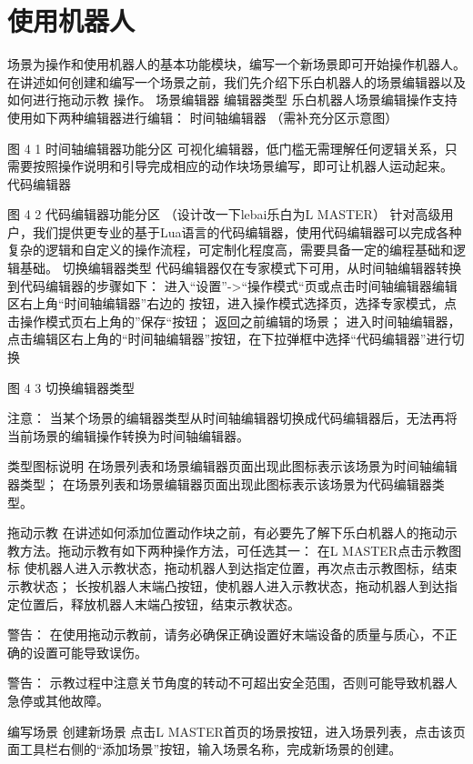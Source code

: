 \chapter{使用机器人}

场景为操作和使用机器人的基本功能模块，编写一个新场景即可开始操作机器人。在讲述如何创建和编写一个场景之前，我们先介绍下乐白机器人的场景编辑器以及如何进行拖动示教 操作。
场景编辑器
编辑器类型
乐白机器人场景编辑操作支持使用如下两种编辑器进行编辑：
时间轴编辑器 
（需补充分区示意图）






图 4 1 时间轴编辑器功能分区
 可视化编辑器，低门槛无需理解任何逻辑关系，只需要按照操作说明和引导完成相应的动作块场景编写，即可让机器人运动起来。
代码编辑器

 
图 4 2  代码编辑器功能分区
（设计改一下lebai乐白为L MASTER）
针对高级用户，我们提供更专业的基于Lua语言的代码编辑器，使用代码编辑器可以完成各种复杂的逻辑和自定义的操作流程，可定制化程度高，需要具备一定的编程基础和逻辑基础。
切换编辑器类型
代码编辑器仅在专家模式下可用，从时间轴编辑器转换到代码编辑器的步骤如下：
	进入“设置”->“操作模式“页或点击时间轴编辑器编辑区右上角“时间轴编辑器”右边的 按钮，进入操作模式选择页，选择专家模式，点击操作模式页右上角的”保存“按钮；
	返回之前编辑的场景；
	进入时间轴编辑器，点击编辑区右上角的“时间轴编辑器”按钮，在下拉弹框中选择“代码编辑器”进行切换
 
图 4 3 切换编辑器类型

 	注意：
当某个场景的编辑器类型从时间轴编辑器切换成代码编辑器后，无法再将当前场景的编辑操作转换为时间轴编辑器。

类型图标说明
 在场景列表和场景编辑器页面出现此图标表示该场景为时间轴编辑器类型；
 在场景列表和场景编辑器页面出现此图标表示该场景为代码编辑器类型。

拖动示教
在讲述如何添加位置动作块之前，有必要先了解下乐白机器人的拖动示教方法。拖动示教有如下两种操作方法，可任选其一：
在L MASTER点击示教图标 使机器人进入示教状态，拖动机器人到达指定位置，再次点击示教图标，结束示教状态；
长按机器人末端凸按钮，使机器人进入示教状态，拖动机器人到达指定位置后，释放机器人末端凸按钮，结束示教状态。

 	警告：
在使用拖动示教前，请务必确保正确设置好末端设备的质量与质心，不正确的设置可能导致误伤。 

 	警告：
示教过程中注意关节角度的转动不可超出安全范围，否则可能导致机器人急停或其他故障。 

编写场景
创建新场景
点击L MASTER首页的场景按钮，进入场景列表，点击该页面工具栏右侧的“添加场景”按钮，输入场景名称，完成新场景的创建。
 
